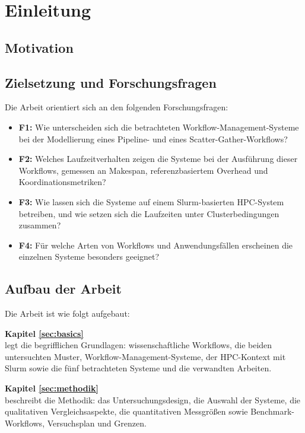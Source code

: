 \chapter{Einleitung}
\label{sec:intro}

\section{Motivation}
\label{sec:intro:motivation}

\section{Zielsetzung und Forschungsfragen}
\label{sec:intro:goal}

Die Arbeit orientiert sich an den folgenden Forschungsfragen:

\begin{itemize}
  \item \textbf{F1:} Wie unterscheiden sich die betrachteten
    Workflow-Management-Systeme bei der Modellierung eines Pipeline-
    und eines Scatter-Gather-Workflows?
  \item \textbf{F2:} Welches Laufzeitverhalten zeigen die Systeme bei
    der Ausführung dieser Workflows, gemessen an Makespan,
    referenzbasiertem Overhead und Koordinationsmetriken?
  \item \textbf{F3:} Wie lassen sich die Systeme auf einem
    Slurm-basierten HPC-System betreiben, und wie setzen sich die
    Laufzeiten unter Clusterbedingungen zusammen?
  \item \textbf{F4:} Für welche Arten von Workflows und
    Anwendungsfällen erscheinen die einzelnen Systeme besonders
    geeignet?
\end{itemize}

\section{Aufbau der Arbeit}
\label{sec:intro:structure}

Die Arbeit ist wie folgt aufgebaut:

\textbf{Kapitel \ref{sec:basics}} \\[0.2em]
legt die begrifflichen Grundlagen: wissenschaftliche Workflows, die
beiden untersuchten Muster, Workflow-Management-Systeme, der
HPC-Kontext mit Slurm sowie die fünf betrachteten Systeme und die
verwandten Arbeiten.

\textbf{Kapitel \ref{sec:methodik}} \\[0.2em]
beschreibt die Methodik: das Untersuchungsdesign, die Auswahl der
Systeme, die qualitativen Vergleichsaspekte, die quantitativen
Messgrößen sowie Benchmark-Workflows, Versuchsplan und Grenzen.

